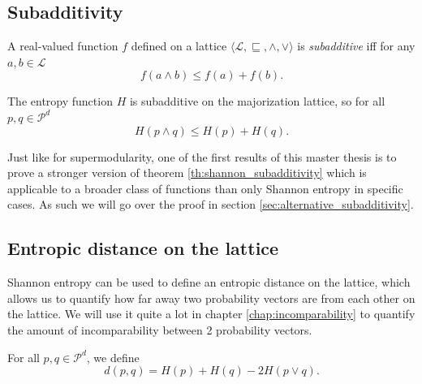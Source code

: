 \subsection{Subadditivity} \label{sec:subadditivity}

\begin{definition}[Subadditivity]
    A real-valued function $f$ defined on a lattice $\langle \mathcal{L}, \sqsubseteq, \wedge, \vee \rangle$ is \textit{subadditive} iff for any $a, b \in \mathcal{L}$
    \begin{equation}
        f(a \wedge b) \leq f(a) + f(b).
    \end{equation}
\end{definition}

\begin{theorem} \label{th:shannon_subadditivity}
    The entropy function $H$ is subadditive on the majorization lattice, so for all $p, q \in \mathcal{P}^d$
    \begin{equation}
        H(p \wedge q) \leq H(p) + H(q).
    \end{equation}
\end{theorem}

Just like for supermodularity, one of the first results of this master thesis is to prove a stronger version of theorem \ref{th:shannon_subadditivity} which is applicable to a broader class of functions than only Shannon entropy in specific cases. As such we will go over the proof in section \ref{sec:alternative_subadditivity}.

\subsection{Entropic distance on the lattice}

Shannon entropy can be used to define an entropic distance on the lattice, which allows us to quantify how far away two probability vectors are from each other on the lattice. We will use it quite a lot in chapter \ref{chap:incomparability} to quantify the amount of incomparability between 2 probability vectors.

\begin{definition}
    For all $p, q \in \mathcal{P}^d$, we define
    \begin{equation}
        d(p, q) = H(p) + H(q) - 2H(p \vee q).
    \end{equation}
\end{definition}

